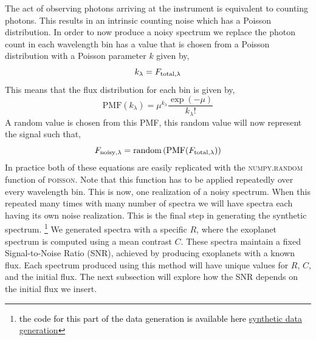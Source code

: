 The act of observing photons arriving at the instrument is equivalent to counting photons.
This results in an intrinsic counting noise which has a Poisson distribution.
In order to now produce a noisy spectrum we replace the photon count in each wavelength bin has a value that is chosen from a Poisson distribution with a Poisson parameter $k$ given by,
 \begin{equation}
     k_\lambda = F_{\rm{total},\lambda}
     \label{eq:noise}
 \end{equation}
This means that the flux distribution for each bin is given by,
 \begin{equation}
    \textrm{PMF}(k_\lambda) = \mu^{k_\lambda}\dfrac{\exp(-\mu)}{k_\lambda!} 
    \label{eq: poisson}
 \end{equation}
A random value is chosen from this PMF, this random value will now represent the signal such that,
 \begin{equation}
     F_{\rm{noisy,\lambda}} = \textrm{random}\left(\textrm{PMF}(F_{\rm{total,\lambda}})\right)
 \end{equation}
In practice both of these equations are easily replicated with the \textsc{numpy.random} function of \textsc{poisson}.
Note that this function has to be applied repeatedly over every wavelength bin.
This is now, one realization of a noisy spectrum.
When this repeated many times with many number of spectra we will have spectra each having its own noise realization. 
This is the final step in generating the synthetic spectrum. \footnote{\textcolor{black}{the code for this part of the data generation is available here} \href{https://github.com/digirak/PhD/blob/master/CCF_code/CCFcore/SyntheticData.py}{synthetic data generation}}
We generated spectra with a specific $R$, where the exoplanet spectrum is computed using a mean contrast $C$. These spectra maintain a fixed Signal-to-Noise Ratio (SNR), achieved by producing exoplanets with a known flux. Each spectrum produced using this method will have unique values for $R$, $C$, and the initial flux. The next subsection will explore how the SNR depends on the initial flux we insert.

